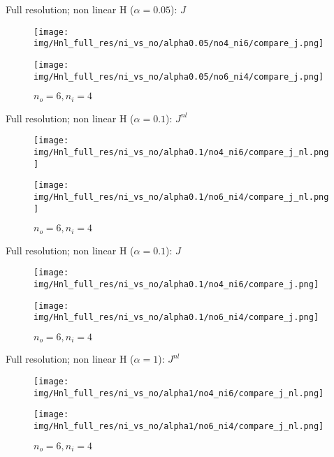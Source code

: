 \documentclass[francais]{beamer}
\begin{document}
\begin{frame}{Full resolution; non linear H ($\alpha = 0.05$): $J$}
\begin{center}
\begin{figure}
  \texttt{[image: img/Hnl\_full\_res/ni\_vs\_no/alpha0.05/no4\_ni6/compare\_j.png]}
  \caption{$n_o = 4, n_i = 6$}
\endminipage\hfill
{}
  \texttt{[image: img/Hnl\_full\_res/ni\_vs\_no/alpha0.05/no6\_ni4/compare\_j.png]}
  \caption{$n_o = 6, n_i = 4$}
\endminipage
\end{figure}
\end{center}
\end{frame}


\begin{frame}{Full resolution; non linear H ($\alpha = 0.1$): $J^{nl}$}
\begin{center}
\begin{figure}
  \texttt{[image: img/Hnl\_full\_res/ni\_vs\_no/alpha0.1/no4\_ni6/compare\_j\_nl.png]}
  \caption{$n_o = 4, n_i = 6$}
\endminipage\hfill
{}
  \texttt{[image: img/Hnl\_full\_res/ni\_vs\_no/alpha0.1/no6\_ni4/compare\_j\_nl.png]}
  \caption{$n_o = 6, n_i = 4$}
\endminipage
\end{figure}
\end{center}
\end{frame}

\begin{frame}{Full resolution; non linear H ($\alpha = 0.1$): $J$}
\begin{center}
\begin{figure}
  \texttt{[image: img/Hnl\_full\_res/ni\_vs\_no/alpha0.1/no4\_ni6/compare\_j.png]}
  \caption{$n_o = 4, n_i = 6$}
\endminipage\hfill
{}
  \texttt{[image: img/Hnl\_full\_res/ni\_vs\_no/alpha0.1/no6\_ni4/compare\_j.png]}
  \caption{$n_o = 6, n_i = 4$}
\endminipage
\end{figure}
\end{center}
\end{frame}


\begin{frame}{Full resolution; non linear H ($\alpha = 1$): $J^{nl}$}
\begin{center}
\begin{figure}
  \texttt{[image: img/Hnl\_full\_res/ni\_vs\_no/alpha1/no4\_ni6/compare\_j\_nl.png]}
  \caption{$n_o = 4, n_i = 6$}
\endminipage\hfill
{}
  \texttt{[image: img/Hnl\_full\_res/ni\_vs\_no/alpha1/no6\_ni4/compare\_j\_nl.png]}
  \caption{$n_o = 6, n_i = 4$}
\endminipage
\end{figure}
\end{center}
\end{frame}
\end{document}
